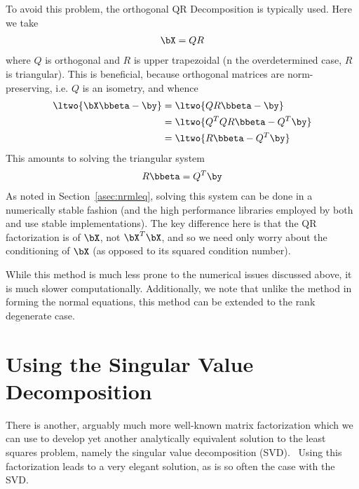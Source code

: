 To avoid this problem, the orthogonal QR Decomposition is typically used.  Here we take 
\begin{align*}
\bX=QR
\end{align*}
where $Q$ is orthogonal and $R$ is upper trapezoidal (n the overdetermined case, $R$ is triangular).  This is beneficial, because orthogonal matrices are norm-preserving, i.e. $Q$ is an isometry, and whence
\begin{align*}
\ltwo{\bX\bbeta - \by} &= \ltwo{QR\bbeta - \by}\\
  &= \ltwo{Q^TQR\bbeta - Q^T\by}\\
  &= \ltwo{R\bbeta - Q^T\by}
\end{align*}
This amounts to solving the triangular system
\begin{align*}
R\bbeta = Q^T\by
\end{align*}
As noted in Section~\ref{asec:nrmleq}, solving this system can be done in a numerically stable fashion (and the high performance libraries employed by both  and
 use stable implementations).  The key difference here is that the QR factorization is of $\bX$, not $\bX^T\bX$, and so we need only worry about the conditioning of $\bX$ (as opposed to its squared condition number).

While this method is much less prone to the numerical issues discussed above, it is much slower computationally.  Additionally, we note that unlike the method in forming the normal equations, this method can be extended to the rank degenerate case.




\section{Using the Singular Value Decomposition}
There is another, arguably much more well-known matrix factorization which we can use to develop yet another analytically equivalent solution to the least squares problem, namely the singular value decomposition
(SVD).~  Using this factorization leads to a very elegant solution, as is so often the case with the SVD.  


